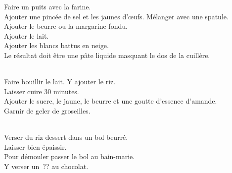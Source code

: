 \begin{minipage}[c]{\textwidth}
Faire un puits avec la farine.\\
Ajouter une pincée de sel et les jaunes d’œufs. Mélanger avec une spatule.\\
Ajouter le beurre ou la margarine fondu.\\
Ajouter le lait.\\
Ajouter les blancs battus en neige.\\
Le résultat doit être une pâte liquide masquant le dos de la cuillère.\\
\\

\end{minipage}

\begin{minipage}[c]{\textwidth}
Faire bouillir le lait. Y ajouter le riz.\\
Laisser cuire 30 minutes. \\
Ajouter le sucre, le jaune, le beurre et une goutte d’essence d’amande.\\
Garnir de geler de groseilles.\\
\\

\end{minipage}

\begin{minipage}[c]{\textwidth}
Verser du riz dessert dans un bol beurré. \\
Laisser bien épaissir.\\
Pour démouler passer le bol au bain-marie.\\
Y verser un ?? au chocolat.\\
\\

\end{minipage}

